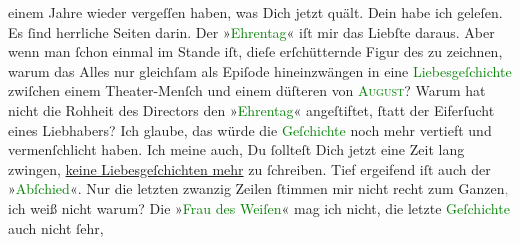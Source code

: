                einem Jahre wieder vergeſſen haben, was Dich jetzt quält.\pend
           \pstart
           Dein \label{K_L02848-111v}\label{K_L02848-111h} habe ich geleſen. Es ſind herrliche Seiten
               darin. Der »\textcolor{green}{Ehrentag}{}\ledrightnote{\textcolor{green}{Der Ehrentag}}« iſt mir das Liebſte
               daraus. Aber wenn man ſchon einmal im Stande iſt, dieſe erſchütternde Figur des
                  \label{K_L02848-6v}\label{K_L02848-6h} zu zeichnen, warum das Alles nur gleichſam als Epiſode hineinzwängen in eine
                  \textcolor{green}{Liebesgeſchichte}{} zwiſchen
               einem Theater-{\pb}Menſch und \strikeout{\textcolor{gray}{×}} einem düſteren \label{K_L02848-8v}\label{K_L02848-8h} von \textsc{\textcolor{green}{August}{}}? Warum hat nicht die Rohheit des Directors den »\textcolor{green}{Ehrentag}{}\ledrightnote{\textcolor{green}{Der Ehrentag}}« angeſtiftet, ſtatt der Eiferſucht eines Liebhabers? Ich glaube,
               das würde die \textcolor{green}{Geſchichte}{} noch
               mehr vertieft und vermenſchlicht haben. Ich meine auch, Du ſollteſt Dich jetzt eine
               Zeit lang zwingen, \uline{keine Liebesgeſchichten mehr} zu
               ſchreiben. Tief ergeifend iſt auch der {\pb}»\textcolor{green}{Abſchied}{}\ledrightnote{\textcolor{green}{Ein Abschied}}«. Nur die letzten zwanzig Zeilen ſtimmen
               mir nicht recht zum Ganzen\textcolor{gray}{,} ich weiß nicht warum? Die »\textcolor{green}{Frau des Weiſen}{}\ledrightnote{\textcolor{green}{Die Frau des Weisen. Erzählung}}« mag ich nicht, die letzte \textcolor{green}{Geſchichte}{} auch nicht ſehr,
